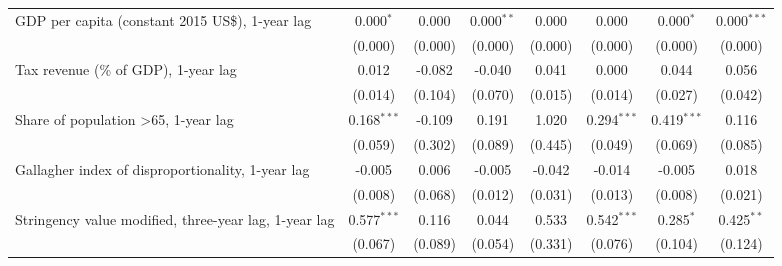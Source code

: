 \begin{table}[htbp]
\begin{tabular}{lccccccc}
      GDP per capita (constant 2015 US\$), 1-year lag                                           & 0.000$^{*}$   & 0.000                     & 0.000$^{**}$   & 0.000            & 0.000           & 0.000$^{*}$     & 0.000$^{***}$\\   
                                                                                                & (0.000)       & (0.000)                   & (0.000)        & (0.000)          & (0.000)         & (0.000)         & (0.000)\\   
      Tax revenue (\% of GDP), 1-year lag                                                       & 0.012         & -0.082                    & -0.040         & 0.041            & 0.000           & 0.044           & 0.056\\   
                                                                                                & (0.014)       & (0.104)                   & (0.070)        & (0.015)          & (0.014)         & (0.027)         & (0.042)\\   
      Share of population >65, 1-year lag                                                       & 0.168$^{***}$ & -0.109                    & 0.191          & 1.020            & 0.294$^{***}$   & 0.419$^{***}$   & 0.116\\   
                                                                                                & (0.059)       & (0.302)                   & (0.089)        & (0.445)          & (0.049)         & (0.069)         & (0.085)\\   
      Gallagher index of disproportionality, 1-year lag                                         & -0.005        & 0.006                     & -0.005         & -0.042           & -0.014          & -0.005          & 0.018\\   
                                                                                                & (0.008)       & (0.068)                   & (0.012)        & (0.031)          & (0.013)         & (0.008)         & (0.021)\\   
      Stringency value modified, three-year lag, 1-year lag                                     & 0.577$^{***}$ & 0.116                     & 0.044          & 0.533            & 0.542$^{***}$   & 0.285$^{*}$     & 0.425$^{**}$\\   
                                                                                                & (0.067)       & (0.089)                   & (0.054)        & (0.331)          & (0.076)         & (0.104)         & (0.124)\\   

\end{tabular}
\end{table}
